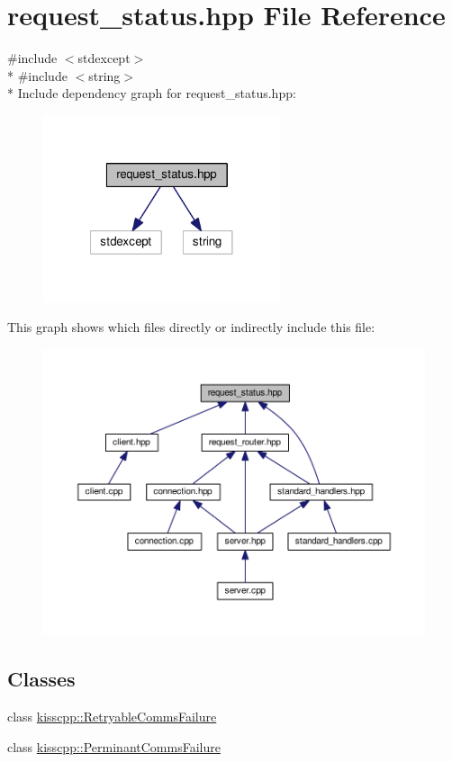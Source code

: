 \hypertarget{a00075}{\section{request\-\_\-status.\-hpp File Reference}
\label{a00075}
}
{\ttfamily \#include $<$stdexcept$>$}\\*
{\ttfamily \#include $<$string$>$}\\*
Include dependency graph for request\-\_\-status.\-hpp\-:\nopagebreak
\begin{figure}[H]
\begin{center}
\leavevmode
\includegraphics[width=197pt]{a00120}
\end{center}
\end{figure}
This graph shows which files directly or indirectly include this file\-:\nopagebreak
\begin{figure}[H]
\begin{center}
\leavevmode
\includegraphics[width=350pt]{a00121}
\end{center}
\end{figure}
\subsection*{Classes}
\begin{DoxyCompactItemize}
\item 
class \hyperlink{a00039}{kisscpp\-::\-Retryable\-Comms\-Failure}
\item 
class \hyperlink{a00034}{kisscpp\-::\-Perminant\-Comms\-Failure}
\end{DoxyCompactItemize}
